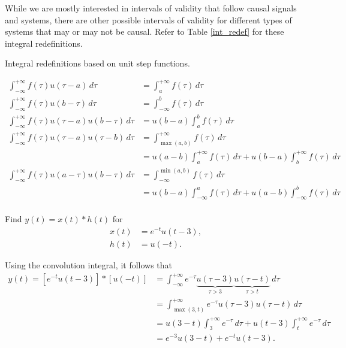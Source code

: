 \documentclass{report}
\begin{document}
While we are mostly interested in intervals of validity that follow causal signals and systems, there are other possible intervals of validity for different 
types of systems that may or may not be causal. Refer to Table \ref{int_redef} for these integral redefinitions. 
\begin{table}[hbt!]
    \centering
    \caption{Integral redefinitions based on unit step functions.}
    \label{int_redef}
    \begin{mdframed}
    \begin{align}
        \int_{-\infty}^{+\infty} f(\tau) u(\tau-a) \,d\tau &= \int_{a}^{+\infty} f(\tau) \,d\tau \\[0.25cm]
        \int_{-\infty}^{+\infty} f(\tau) u(b-\tau) \,d\tau &= \int_{-\infty}^{b} f(\tau) \,d\tau \\[0.25cm]
        \int_{-\infty}^{+\infty} f(\tau) u(\tau-a) u(b-\tau) \,d\tau &= u(b-a)\int_{a}^{b} f(\tau) \,d\tau \\[0.25cm]
        \int_{-\infty}^{+\infty} f(\tau) u(\tau-a) u(\tau-b) \,d\tau &= \int_{\max(a,b)}^{+\infty} f(\tau) \,d\tau \nonumber \\ 
        &= u(a-b) \int_{a}^{+\infty} f(\tau) \,d\tau + u(b-a) \int_{b}^{+\infty} f(\tau) \,d\tau \\[0.25cm] 
        \int_{-\infty}^{+\infty} f(\tau) u(a-\tau) u(b-\tau) \,d\tau &= \int_{-\infty}^{\min(a,b)} f(\tau) \,d\tau \nonumber \\ 
        &= u(b-a) \int_{-\infty}^{a} f(\tau) \,d\tau + u(a-b) \int_{-\infty}^{b} f(\tau) \,d\tau \\[0.15cm] \nonumber
    \end{align}
    \end{mdframed}
\end{table} 

\begin{example}
    Find $y(t)=x(t)*h(t)$ for 
    \begin{align*}
        x(t) &= e^{-t}u(t-3), \\
        h(t) &= u(-t).
    \end{align*} 
\end{example}
\begin{solution}
    Using the convolution integral, it follows that 
    \begin{align*}
        y(t) = [e^{-t}u(t-3)] * [u(-t)] &= \int_{-\infty}^{+\infty} e^{-\tau} \underbrace{u(\tau-3)}_\textrm{$\tau>3$} \underbrace{u(\tau-t)}_\textrm{$\tau>t$} \,d\tau \\
        &= \int_{\max(3,t)}^{+\infty} e^{-\tau} u(\tau-3)u(\tau-t) \,d\tau \\
        &= u(3-t)\int_{3}^{+\infty} e^{-\tau} \,d\tau + u(t-3)\int_{t}^{+\infty} e^{-\tau} \,d\tau \\
        &= e^{-3}u(3-t)+e^{-t}u(t-3).
    \end{align*}
\end{solution}
\end{document}
